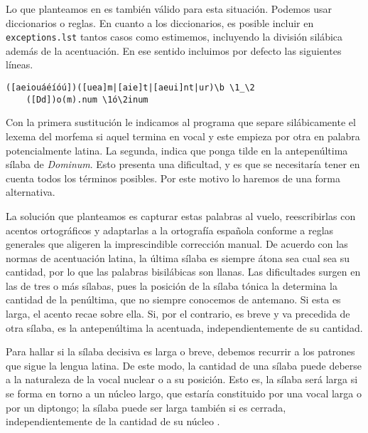 Lo que planteamos en  es también válido para esta situación. Podemos usar diccionarios o reglas. En cuanto a los diccionarios, es posible incluir en \texttt{exceptions.lst} tantos casos como estimemos, incluyendo la división silábica además de la acentuación. En ese sentido incluimos por defecto las siguientes líneas.

\begin{Verbatim}[fontsize=\footnotesize,xleftmargin=5ex]
	([aeiouáéíóú])([uea]m|[aie]t|[aeui]nt|ur)\b \1_\2
	([Dd])o(m).num \1ó\2inum         
\end{Verbatim}

Con la primera sustitución le indicamos al programa que separe silábicamente el lexema del morfema si aquel termina en vocal y este empieza por otra en palabra potencialmente latina. La segunda, indica que ponga tilde en la antepenúltima sílaba de \textit{Dominum}. Esto presenta una dificultad, y es que  se necesitaría tener en cuenta todos los términos posibles. Por este motivo lo haremos de una forma alternativa.

La solución que planteamos es capturar estas palabras al vuelo, reescribirlas con acentos ortográficos y adaptarlas a la ortografía española conforme a reglas generales que aligeren la imprescindible corrección manual. De acuerdo con las normas de acentuación latina, la última sílaba es siempre átona sea cual sea su cantidad, por lo que las palabras bisilábicas son llanas. Las dificultades surgen en las de tres o más sílabas, pues la posición de la sílaba tónica la determina la cantidad de la penúltima, que no siempre conocemos de antemano. Si esta es larga, el acento recae sobre ella. Si, por el contrario, es breve y va precedida de otra sílaba, es la antepenúltima la acentuada, independientemente de su cantidad.

Para hallar si la sílaba decisiva es larga o breve, debemos recurrir a los patrones que sigue la lengua latina.  De este modo, la cantidad de una sílaba puede deberse a la naturaleza de la vocal nuclear o a su posición. Esto es, la sílaba será larga si se forma en torno a un núcleo largo, que estaría constituido por una vocal larga o por un diptongo; la sílaba puede ser larga también si es cerrada, independientemente de la cantidad de su núcleo \parencite[XI]{stowasser1998}.

